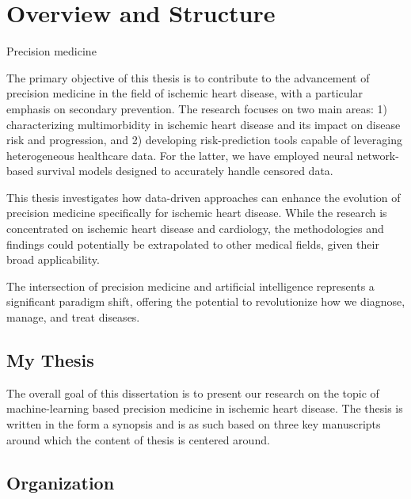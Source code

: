 \chapter{Overview and Structure} \label{intro}

Precision medicine

The primary objective of this thesis is to contribute to the advancement of
precision medicine in the field of ischemic heart disease, with a particular
emphasis on secondary prevention. The research focuses on two main areas: 1)
characterizing multimorbidity in ischemic heart disease and its impact on
disease risk and progression, and 2) developing risk-prediction tools capable
of leveraging heterogeneous healthcare data. For the latter, we have employed
neural network-based survival models designed to accurately handle censored
data.

This thesis investigates how data-driven approaches can enhance the evolution
of precision medicine specifically for ischemic heart disease. While the
research is concentrated on ischemic heart disease and cardiology, the
methodologies and findings could potentially be extrapolated to other medical
fields, given their broad applicability.

The intersection of precision medicine and artificial intelligence represents a
significant paradigm shift, offering the potential to revolutionize how we
diagnose, manage, and treat diseases.

\section{My Thesis}

The overall goal of this dissertation is to present 
our research on the topic of machine-learning based 
precision medicine in ischemic heart disease.
The thesis is written in the form a synopsis 
and is as such based on three key manuscripts around 
which the content of thesis is centered around.

\section{Organization}

